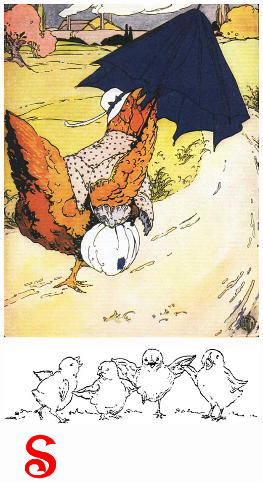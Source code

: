 \documentclass[letterpaper, 10pt, openany]{memoir}
\begin{document}
\newpage
\begin{center}
	\includegraphics[width=\textwidth]{image_051_1.jpg}
\end{center}

\newpage
\begin{center}
	\includegraphics[width=\textwidth]{image_009_2.jpg}
\end{center}

\vspace{\onelineskip}
\begin{figure}
	\vspace{-2\onelineskip}
	\includegraphics[width=0.15\textwidth]{image_017_1.jpg}
\end{figure}
\end{document}
